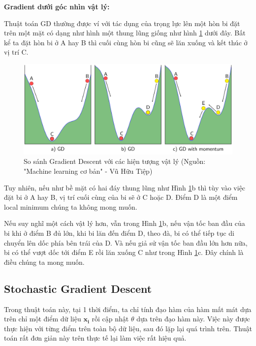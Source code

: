 \textbf{Gradient dưới góc nhìn vật lý:}

Thuật toán GD thường được ví với tác dụng của trọng lực lên một hòn bi đặt trên một mặt có dạng như hình một thung lũng giống như hình \ref{fig:gradient} dưới đây. Bất kể ta đặt hòn bi ở A hay B thì cuối cùng hòn bi cũng sẽ lăn xuống và kết thúc ở vị trí C.

\FloatBarrier
\begin{figure}[htp]
\begin{center}
\includegraphics[scale=0.06]{chap4/c4_figs/momentum.png}
\end{center}
\caption{So sánh Gradient Descent với các hiện tượng vật lý (Nguồn: "Machine learning cơ bản" - Vũ Hữu Tiệp)}
\label{fig:gradient}
\end{figure}
\FloatBarrier

Tuy nhiên, nếu như bề mặt có hai đáy thung lũng như Hình \ref{fig:gradient}b thì tùy vào việc đặt bi ở A hay B, vị trí cuối cùng của bi sẽ ở C hoặc D. Điểm D là một điểm local minimum chúng ta không mong muốn.

Nếu suy nghĩ một cách vật lý hơn, vẫn trong Hình \ref{fig:gradient}b, nếu vận tốc ban đầu của bi khi ở điểm B đủ lớn, khi bi lăn đến điểm D, theo đà, bi có thể tiếp tục di chuyển lên dốc phía bên trái của D. Và nếu giả sử vận tốc ban đầu lớn hơn nữa, bi có thể vượt dốc tới điểm E rồi lăn xuống C như trong Hình \ref{fig:gradient}c. Đây chính là điều chúng ta mong muốn.

\subsection{Stochastic Gradient Descent}
Trong thuật toán này, tại 1 thời điểm, ta chỉ tính đạo hàm của hàm mất mát dựa trên chỉ một điểm dữ liệu $\mathbf{x_i}$ rồi cập nhật 
$\theta$ dựa trên đạo hàm này. Việc này được thực hiện với từng điểm trên toàn bộ dữ liệu, sau đó lặp lại quá trình trên. Thuật toán rất đơn giản này trên thực tế lại làm việc rất hiệu quả.

